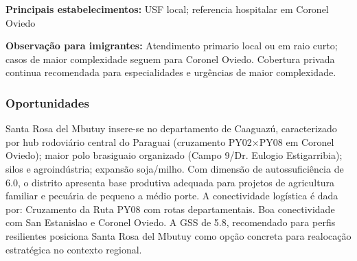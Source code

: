 \textbf{Principais estabelecimentos:} USF local; referencia hospitalar
em Coronel Oviedo

\textbf{Observação para imigrantes:} Atendimento primario local ou em
raio curto; casos de maior complexidade seguem para Coronel Oviedo.
Cobertura privada continua recomendada para especialidades e urgências
de maior complexidade.
\newpage

\subsubsection*{Oportunidades}\label{oport-santa-rosa-del-mbutuy-0505}
Santa Rosa del Mbutuy insere-se no departamento de Caaguazú, caracterizado por hub rodoviário central do Paraguai (cruzamento PY02×PY08 em Coronel Oviedo); maior polo brasiguaio organizado (Campo 9/Dr. Eulogio Estigarribia); silos e agroindústria; expansão soja/milho. Com dimensão de autossuficiência de 6.0, o distrito apresenta base produtiva adequada para projetos de agricultura familiar e pecuária de pequeno a médio porte. A conectividade logística é dada por: Cruzamento da Ruta PY08 com rotas departamentais. Boa conectividade com San Estanislao e Coronel Oviedo. A GSS de 5.8, recomendado para perfis resilientes posiciona Santa Rosa del Mbutuy como opção concreta para realocação estratégica no contexto regional.

